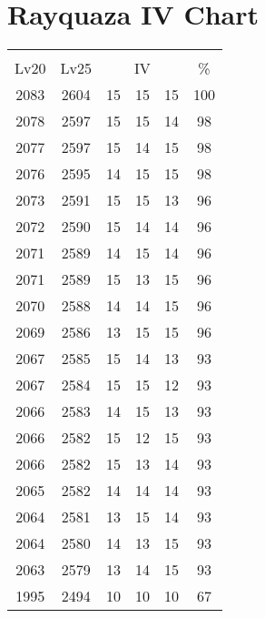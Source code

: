 \documentclass{article}%
\begin{document}
%
\normalsize%
\section{Rayquaza IV Chart}%
\label{sec:Rayquaza IV Chart}%
\renewcommand{\arraystretch}{1.5}%
\begin{tabular}{|c|c|c|c|c|c|}%
\hline%
\multicolumn{6}{|c|}{\textcolor{white}{ 
\linebreak{Rayquaza}
}%
\cellcolor{black}}\\%
\multicolumn{1}{|c}{Lv20}&\multicolumn{1}{c|}{Lv25}&\multicolumn{3}{c|}{IV}&\multicolumn{1}{|c|}{\%}\\%
\hline%
\rowcolor{color100}%
2083&2604&15&15&15&100\\%
\hline%
\rowcolor{color98}%
2078&2597&15&15&14&98\\%
\hline%
\rowcolor{color98}%
2077&2597&15&14&15&98\\%
\hline%
\rowcolor{color98}%
2076&2595&14&15&15&98\\%
\hline%
\rowcolor{color96}%
2073&2591&15&15&13&96\\%
\hline%
\rowcolor{color96}%
2072&2590&15&14&14&96\\%
\hline%
\rowcolor{color96}%
2071&2589&14&15&14&96\\%
\hline%
\rowcolor{color96}%
2071&2589&15&13&15&96\\%
\hline%
\rowcolor{color96}%
2070&2588&14&14&15&96\\%
\hline%
\rowcolor{color96}%
2069&2586&13&15&15&96\\%
\hline%
\rowcolor{color93}%
2067&2585&15&14&13&93\\%
\hline%
\rowcolor{color93}%
2067&2584&15&15&12&93\\%
\hline%
\rowcolor{color93}%
2066&2583&14&15&13&93\\%
\hline%
\rowcolor{color93}%
2066&2582&15&12&15&93\\%
\hline%
\rowcolor{color93}%
2066&2582&15&13&14&93\\%
\hline%
\rowcolor{color93}%
2065&2582&14&14&14&93\\%
\hline%
\rowcolor{color93}%
2064&2581&13&15&14&93\\%
\hline%
\rowcolor{color93}%
2064&2580&14&13&15&93\\%
\hline%
\rowcolor{color93}%
2063&2579&13&14&15&93\\%
\hline%
\rowcolor{color91}%
1995&2494&10&10&10&67\\%
\end{tabular}

%
\end{document}
